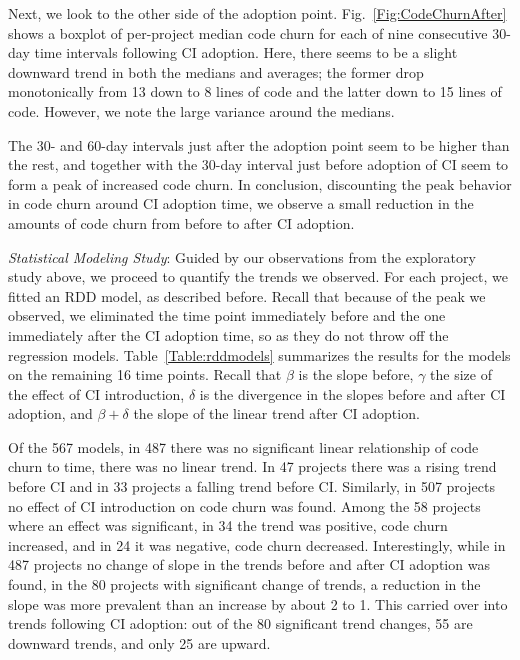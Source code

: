 Next, we look to the other side of the adoption point. 
Fig.~\ref{Fig:CodeChurnAfter} shows a boxplot of per-project median code 
churn for each of nine consecutive 30-day time intervals following CI adoption.
Here, there seems to be a slight downward trend in both the medians and 
averages; the former drop monotonically from 13 down to 8 lines of code and 
the latter down to 15 lines of code.
However, we note the large variance around the medians.

The 30- and 60-day intervals just after the adoption point seem to be higher 
than the rest, and together with the 30-day interval just before adoption of CI 
seem to form a peak of increased code churn.
In conclusion, discounting the peak behavior in code churn around CI adoption 
time, we observe a small reduction in the amounts of code churn from before 
to after CI adoption.



\smallskip\noindent \emph{Statistical Modeling Study}: 
Guided by our observations from the exploratory study above, we proceed to 
quantify the trends we observed.
For each project, we fitted an RDD model, as described before.
Recall that because of the peak we observed, we eliminated the time point 
immediately before and the one immediately after the CI adoption time, so as 
they do not throw off the regression models.
Table~\ref{Table:rddmodels} summarizes the results for the models on the 
remaining 16 time points.
Recall that $\beta$ is the slope before, $\gamma$ the size of the effect of 
CI introduction, $\delta$ is the divergence in the slopes before and after CI 
adoption, and $\beta + \delta$ the slope of the linear trend after CI adoption.

Of the 567 models, in 487 there was no significant linear relationship of 
code churn to time, \ie there was no linear trend.
In 47 projects there was a rising trend before CI and in 33 projects a falling 
trend before CI.
Similarly, in 507 projects no effect of CI introduction on code churn was found. 
Among the 58 projects where an effect was significant, in 34 the trend was 
positive, \ie code churn increased, and in 24 it was negative, \ie code churn 
decreased.
Interestingly, while in 487 projects no change of slope in the trends before 
and after CI adoption was found, in the 80 projects with significant change 
of trends, a reduction in the slope was more prevalent than an increase by 
about 2 to 1.
This carried over into trends following CI adoption: out of the 80 significant 
trend changes, 55 are downward trends, and only 25 are upward.


